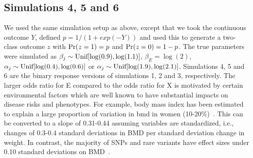 \begin{comment}
\begin{figure}[h!]
	\centering
	\texttt{[image: figure4.eps]}
	\caption{Visualization of the relationship between the response, the first principal component of the main effects and $f(Q_i)$ in~\eqref{eq:sim3} for $E=0$ (left) and $E=1$ (right) in simulation scenario 3. This graphic also depicts the intuition behind model~\eqref{eq:nonlinear}.}
	\label{fig:sim3-perp}
\end{figure}
\end{comment}



\subsection*{Simulations 4, 5 and 6}
We used the same simulation setup as above, except that we took the continuous outcome $Y$, defined $p = 1/(1+exp(-Y))$ and used this to generate a two-class outcome $z$ with $\textrm{{Pr}}(z=1)=p$ and $\textrm{{Pr}}(z=0)=1-p$. The true parameters were simulated as $\beta_j \sim \textrm{{Unif}}[\log(0.9), \log(1.1)]$, $\beta_E = \log(2)$, $\alpha_j \sim \textrm{{Unif}}[\log(0.4), \log(0.6)]$ or $\alpha_j \sim \textrm{{Unif}}[\log(1.9), \log(2.1)]$. Simulations 4, 5 and 6 are the binary response versions of simulations 1, 2 and 3, respectively. The larger odds ratio for E compared to the odds ratio for X is motivated by certain environmental factors which are well known to have substantial impacts on disease risks and phenotypes. For example, body mass index has been estimated to explain a large proportion of variation in \ac{bmd} in women (10-20\%)~\citep{felson1993effects}. This can be converted to a slope of 0.31-0.44 assuming variables are standardized, i.e., changes of 0.3-0.4 standard deviations in BMD per standard deviation change in weight. In contrast, the majority of SNPs and rare variants have effect sizes under 0.10 standard deviations on BMD~\citep{kemp2017identification}.


